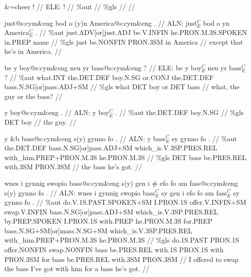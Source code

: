 \documentclass[a4paper,10pt]{article}
\begin{document}
\ex
\begingl[lingstyle=gergl]
\glchat \&=cheer ! //
\glsurface ELE:  !  //
\glauto \%aut    //
\glmanual \%gls    //
\gleng  //
\endgl
\xe

\ex
\begingl[lingstyle=gergl]
\glchat just@s:cym\&eng bod o (y)n America@s:cym\&eng . //
\glsurface ALN:  just$^{C}_{E}$ bod o yn America$^{C}_{E}$ .  //
\glauto \%aut  just{\scriptsize .ADV[or]just.ADJ} be{\scriptsize .V.INFIN} he{\scriptsize .PRON.M.3S.SPOKEN} in{\scriptsize .PREP} name   //
\glmanual \%gls  just be{\scriptsize .NONFIN} PRON{\scriptsize .3SM} in America   //
\gleng except that he's in America. //
\endgl
\xe

\ex
\begingl[lingstyle=gergl]
\glchat be y boy@s:cym\&eng neu yr bass@s:cym\&eng ? //
\glsurface ELE:  be y boy$^{C}_{E}$ neu yr bass$^{C}_{E}$ ?  //
\glauto \%aut  what{\scriptsize .INT} the{\scriptsize .DET.DEF} boy{\scriptsize .N.SG} or{\scriptsize .CONJ} the{\scriptsize .DET.DEF} bass{\scriptsize .N.SG[or]pass.ADJ+SM}   //
\glmanual \%gls  what DET boy or DET bass   //
\gleng what, the guy or the bass? //
\endgl
\xe

\ex
\begingl[lingstyle=gergl]
\glchat y boy@s:cym\&eng . //
\glsurface ALN:  y boy$^{C}_{E}$ .  //
\glauto \%aut  the{\scriptsize .DET.DEF} boy{\scriptsize .N.SG}   //
\glmanual \%gls  DET boy   //
\gleng the guy. //
\endgl
\xe

\ex
\begingl[lingstyle=gergl]
\glchat y \&b bass@s:cym\&eng s(y) gynno fo . //
\glsurface ALN:  y bass$^{C}_{E}$ sy gynno fo .  //
\glauto \%aut  the{\scriptsize .DET.DEF} bass{\scriptsize .N.SG[or]pass.ADJ+SM} which\_is{\scriptsize .V.3SP.PRES.REL} with\_him{\scriptsize .PREP+PRON.M.3S} he{\scriptsize .PRON.M.3S}   //
\glmanual \%gls  DET bass be{\scriptsize .PRES.REL} with{\scriptsize .3SM} PRON{\scriptsize .3SM}   //
\gleng the bass he's got. //
\endgl
\xe

\ex
\begingl[lingstyle=gergl]
\glchat wnes i gynnig swopio bass@s:cym\&eng s(y) gen i \# efo fo am fass@s:cym\&eng s(y) gynno fo . //
\glsurface ALN:  wnes i gynnig swopio bass$^{C}_{E}$ sy gen i efo fo am fass$^{C}_{E}$ sy gynno fo .  //
\glauto \%aut  do{\scriptsize .V.1S.PAST.SPOKEN+SM} I{\scriptsize .PRON.1S} offer{\scriptsize .V.INFIN+SM} swap{\scriptsize .V.INFIN} bass{\scriptsize .N.SG[or]pass.ADJ+SM} which\_is{\scriptsize .V.3SP.PRES.REL} by{\scriptsize .PREP.SPOKEN} I{\scriptsize .PRON.1S} with{\scriptsize .PREP} he{\scriptsize .PRON.M.3S} for{\scriptsize .PREP} bass{\scriptsize .N.SG+SM[or]mass.N.SG+SM} which\_is{\scriptsize .V.3SP.PRES.REL} with\_him{\scriptsize .PREP+PRON.M.3S} he{\scriptsize .PRON.M.3S}   //
\glmanual \%gls  do{\scriptsize .1S.PAST} PRON{\scriptsize .1S} offer{\scriptsize .NONFIN} swap{\scriptsize .NONFIN} bass be{\scriptsize .PRES.REL} with{\scriptsize .1S} PRON{\scriptsize .1S} with PRON{\scriptsize .3SM} for bass be{\scriptsize .PRES.REL} with{\scriptsize .3SM} PRON{\scriptsize .3SM}   //
\gleng I offered to swap the bass I've got with him for a bass he's got. //
\endgl
\xe
\end{document}
